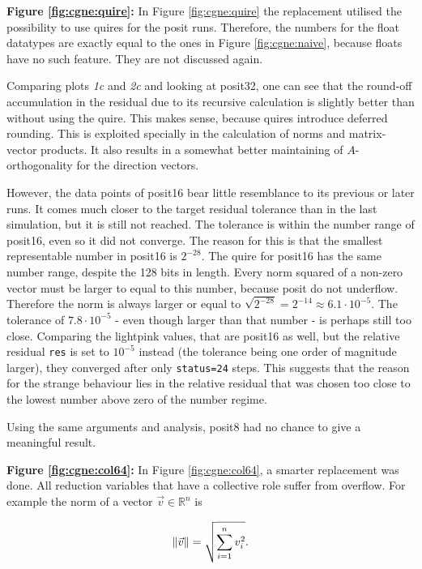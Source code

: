 \documentclass{article}
\theoremstyle{plain} %
\theoremstyle{convention} %
\theoremstyle{remark} %
\def\code#1{\texttt{#1}}
\numberwithin{equation}{section}
\begin{document}
\textbf{Figure \ref{fig:cgne:quire}:} In Figure \ref{fig:cgne:quire} the replacement utilised the possibility to use \glspl{quire} for the posit runs. Therefore, the numbers for the float datatypes are exactly equal to the ones in Figure \ref{fig:cgne:naive}, because floats have no such feature. They are not discussed again.

Comparing plots \textit{1c} and \textit{2c} and looking at \gls{posit32}, one can see that the round-off accumulation in the residual due to its recursive calculation is slightly better than without using the \gls{quire}. This makes sense, because \glspl{quire} introduce deferred rounding. This is exploited specially in the calculation of norms and matrix-vector products. It also results in a somewhat better maintaining of $A$-orthogonality for the direction vectors.

However, the data points of \gls{posit16} bear little resemblance to its previous or later runs. It comes much closer to the target residual tolerance than in the last simulation, but it is still not reached. The tolerance is within the number range of \gls{posit16}, even so it did not converge. The reason for this is that the smallest representable number in \gls{posit16} is $2^{-28}$. The \gls{quire} for \gls{posit16} has the same number range, despite the \num{128} bits in length. Every norm squared of a non-zero vector must be larger to equal to this number, because posit do not underflow. Therefore the norm is always larger or equal to $\sqrt{2^{-28}} = 2^{-14} \approx 6.1 \cdot 10^{-5}$. The tolerance of $7.8 \cdot 10^{-5}$ - even though larger than that number - is perhaps still too close. Comparing the \textcolor{clightpink}{lightpink} values, that are \gls{posit16} as well, but the relative residual \code{res} is set to $10^{-5}$ instead (the tolerance being one order of magnitude larger), they converged after only \code{status=24} steps. This suggests that the reason for the strange behaviour lies in the relative residual that was chosen too close to the lowest number above zero of the number regime.

Using the same arguments and analysis, \gls{posit8} had no chance to give a meaningful result.

\textbf{Figure \ref{fig:cgne:col64}:} In Figure \ref{fig:cgne:col64}, a smarter replacement was done. All reduction variables that have a collective role suffer from overflow. For example the norm of a vector $\vec{v} \in \mathbb{R}^n$ is 

\begin{align*}
    \norm{\vec{v}} = \sqrt{ \sum_{i=1}^{n} v_i^2 }.
\end{align*}
\end{document}
